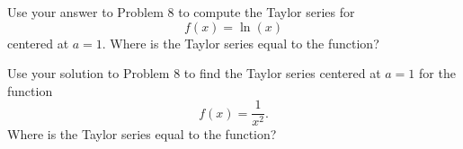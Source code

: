 \documentclass[12pt]{amsart}
\begin{document}
\vspace{2in}

\begin{thm}[10 Points]
  Use your answer to Problem 8 to compute the Taylor series for
  \[f(x) = \ln(x)\]
  centered at \(a = 1\).
  Where is the Taylor series equal to the function?
\end{thm}

\newpage

\begin{thm}[10 Points]
  Use your solution to Problem 8 to find the Taylor series centered at \(a = 1\) for the function
  \[f(x) = \frac{1}{x^2}.\]
  Where is the Taylor series equal to the function?
\end{thm}
\end{document}
